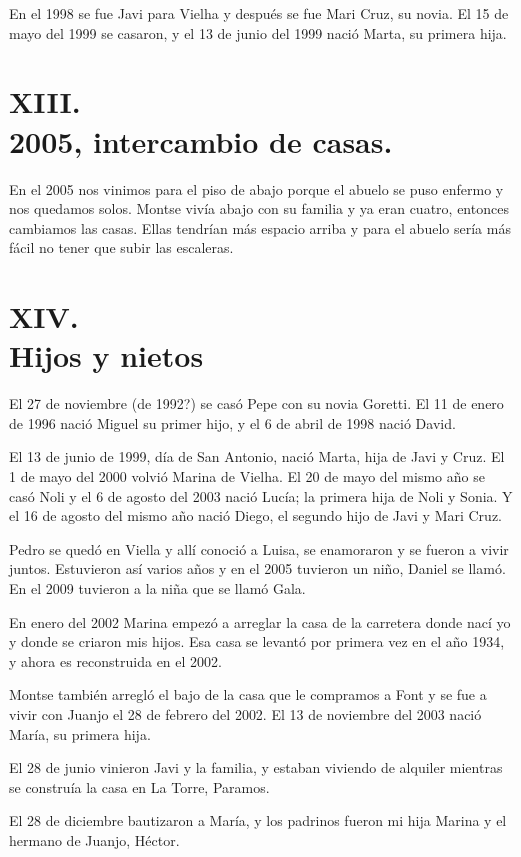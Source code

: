 \documentclass[12pt,a5paper]{book}
\begin{document}
En el 1998 se fue Javi para Vielha y después se fue Mari Cruz, su novia. El 15 de mayo del 1999 se casaron, y el 13 de junio del 1999 nació Marta, su primera hija.


\section*{XIII.\\2005, intercambio de casas.}

En el 2005 nos vinimos para el piso de abajo porque el abuelo se puso enfermo y nos quedamos solos. Montse vivía abajo con su familia y ya eran cuatro, entonces cambiamos las casas. Ellas tendrían más espacio arriba y para el abuelo sería más fácil no tener que subir las escaleras.


\section*{XIV.\\Hijos y nietos}

El 27 de noviembre (de 1992?) se casó Pepe con su novia Goretti. El 11 de enero de 1996 nació Miguel su primer hijo, y el 6 de abril de 1998 nació David.

El 13 de junio de 1999, día de San Antonio, nació Marta, hija de Javi y Cruz. El 1 de mayo del 2000 volvió Marina de Vielha. El 20 de mayo del mismo año se casó Noli y el 6 de agosto del 2003 nació Lucía; la primera hija de Noli y Sonia. Y el 16 de agosto del mismo año nació Diego, el segundo hijo de Javi y Mari Cruz.

Pedro se quedó en Viella y allí conoció a Luisa, se enamoraron y se fueron a vivir juntos. Estuvieron así varios años y en el 2005 tuvieron un niño, Daniel se llamó. En el 2009 tuvieron a la niña que se llamó Gala.

En enero del 2002 Marina empezó a arreglar la casa de la carretera donde nací yo y donde se criaron mis hijos. Esa casa se levantó por primera vez en el año 1934, y ahora es reconstruida en el 2002.

Montse también arregló el bajo de la casa que le compramos a Font y se fue a vivir con Juanjo el 28 de febrero del 2002. El 13 de noviembre del 2003 nació María, su primera hija.

El 28 de junio vinieron Javi y la familia, y estaban viviendo de alquiler mientras se construía la casa en La Torre, Paramos.

El 28 de diciembre bautizaron a María, y los padrinos fueron mi hija Marina y el hermano de Juanjo, Héctor.
\end{document}
